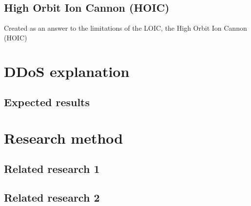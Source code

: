 \documentclass[a4paper, titlepage,12pt]{article}
\begin{document}
	\subsection{High Orbit Ion Cannon (HOIC)}
		Created as an answer to the limitations of the LOIC, the High Orbit Ion Cannon (HOIC)
	\section{DDoS explanation}
	\subsection{Expected results}
	\section{Research method}
	\subsection{Related research 1}
	\subsection{Related research 2}
\end{document}
